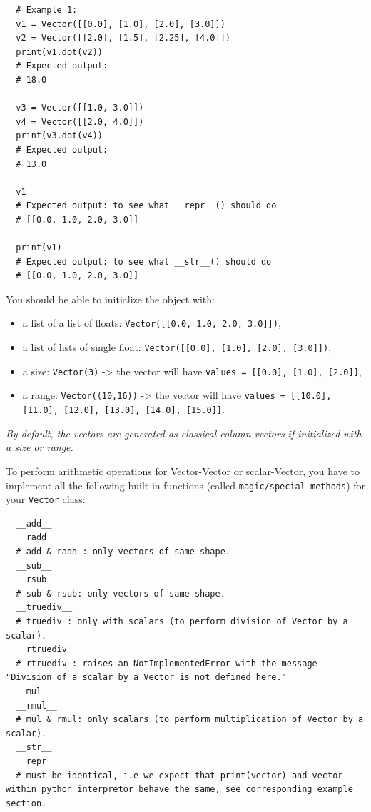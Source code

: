 \documentclass{42-en}
\begin{document}
\begin{verbatim}
  # Example 1:
  v1 = Vector([[0.0], [1.0], [2.0], [3.0]])
  v2 = Vector([[2.0], [1.5], [2.25], [4.0]])
  print(v1.dot(v2))
  # Expected output:
  # 18.0

  v3 = Vector([[1.0, 3.0]])
  v4 = Vector([[2.0, 4.0]])
  print(v3.dot(v4))
  # Expected output:
  # 13.0

  v1
  # Expected output: to see what __repr__() should do
  # [[0.0, 1.0, 2.0, 3.0]]

  print(v1)
  # Expected output: to see what __str__() should do
  # [[0.0, 1.0, 2.0, 3.0]]
\end{verbatim}

You should be able to initialize the object with:
\begin{itemize}
  \item a list of a list of floats: \texttt{Vector([[0.0, 1.0, 2.0, 3.0]])},
  \item a list of lists of single float: \texttt{Vector([[0.0], [1.0], [2.0], [3.0]])},
  \item a size: \texttt{Vector(3)} -> the vector will have \texttt{values = [[0.0], [1.0], [2.0]]},
  \item a range: \texttt{Vector((10,16))} -> the vector will have \texttt{values = [[10.0], [11.0], [12.0], [13.0], [14.0], [15.0]]}.
\end{itemize}

\textit{By default, the vectors are generated as classical column vectors if initialized with a size or range.}

To perform arithmetic operations for Vector-Vector or scalar-Vector, you have to implement all the following built-in functions (called \texttt{magic/special methods}) for your \texttt{Vector} class:

\begin{verbatim}
  __add__
  __radd__
  # add & radd : only vectors of same shape.
  __sub__
  __rsub__
  # sub & rsub: only vectors of same shape.
  __truediv__
  # truediv : only with scalars (to perform division of Vector by a scalar).
  __rtruediv__
  # rtruediv : raises an NotImplementedError with the message "Division of a scalar by a Vector is not defined here."
  __mul__
  __rmul__
  # mul & rmul: only scalars (to perform multiplication of Vector by a scalar).
  __str__
  __repr__
  # must be identical, i.e we expect that print(vector) and vector within python interpretor behave the same, see corresponding example section.
\end{verbatim}
\end{document}
